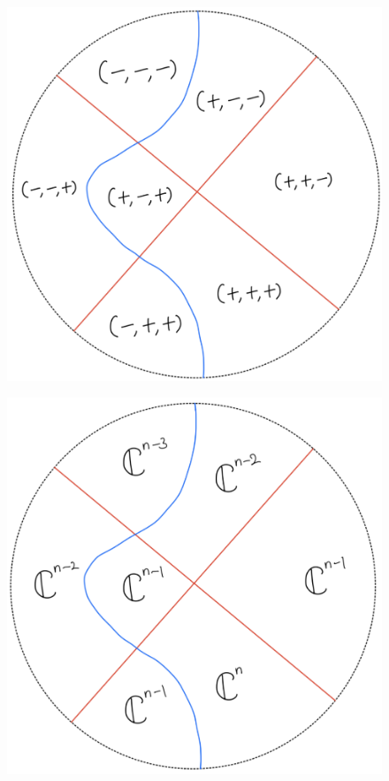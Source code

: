 \begin{figure}[H]
    \centering
    \includegraphics[scale = 0.45]{diagrams/lemma4/26.png}
    \caption{}
    \label{fig:your-label}
\end{figure}
\begin{figure}[H]
    \centering
    \includegraphics[scale = 0.45]{diagrams/cobord'4/27.png}
    \caption{}
    \label{fig:your-label}
\end{figure}
